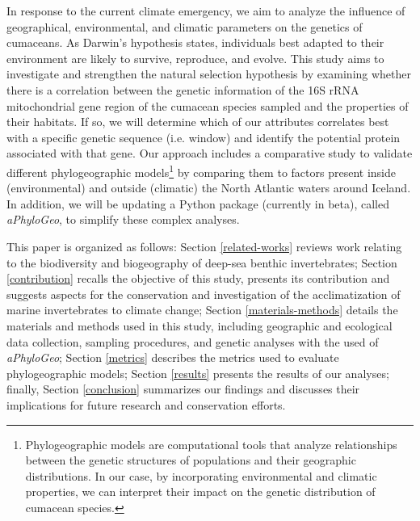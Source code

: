 In response to the current climate emergency, we aim to analyze the influence of geographical, environmental, and climatic parameters on the genetics of cumaceans. As Darwin's hypothesis states, individuals best adapted to their environment are likely to survive, reproduce, and evolve. This study aims to investigate and strengthen the natural selection hypothesis by examining whether there is a correlation between the genetic information of the 16S rRNA mitochondrial gene region of the cumacean species sampled and the properties of their habitats. If so, we will determine which of our attributes correlates best with a specific genetic sequence (i.e. window) and identify the potential protein associated with that gene. Our approach includes a comparative study to validate different {phylogeographic models}\footnote{Phylogeographic models are computational tools that analyze relationships between the genetic structures of populations and their geographic distributions. In our case, by incorporating environmental and climatic properties, we can interpret their impact on the genetic distribution of cumacean species.} by comparing them to factors present inside (environmental) and outside (climatic) the North Atlantic waters around Iceland. In addition, we will be updating a Python package (currently in beta), called \textit{aPhyloGeo}, to simplify these complex analyses.

This paper is organized as follows: Section \autoref{related-works} reviews work relating to the biodiversity and biogeography of deep-sea benthic invertebrates; Section \autoref{contribution} recalls the objective of this study, presents its contribution and suggests aspects for the conservation and investigation of the acclimatization of marine invertebrates to climate change; Section \autoref{materials-methods} details the materials and methods used in this study, including geographic and ecological data collection, sampling procedures, and genetic analyses with the used of \textit{aPhyloGeo}; Section \autoref{metrics} describes the metrics used to evaluate phylogeographic models; Section \autoref{results} presents the results of our analyses; finally, Section \autoref{conclusion} summarizes our findings and discusses their implications for future research and conservation efforts.

